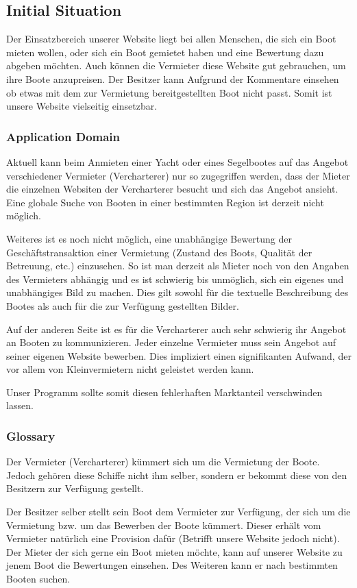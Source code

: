 \documentclass[12pt]{article}
\theoremstyle{definition}
\begin{document}
\subsection{Initial Situation}
	Der Einsatzbereich unserer Website liegt bei allen Menschen, die sich ein Boot mieten wollen, oder sich ein Boot gemietet haben und eine Bewertung dazu abgeben möchten.
	Auch können die Vermieter diese Website gut gebrauchen, um ihre Boote anzupreisen.
	Der Besitzer kann Aufgrund der Kommentare einsehen ob etwas mit dem zur Vermietung bereitgestellten Boot nicht passt. Somit ist unsere Website vielseitig einsetzbar.	

\subsubsection{Application Domain}
	Aktuell kann beim Anmieten einer Yacht oder eines Segelbootes auf das Angebot verschiedener Vermieter (Vercharterer) nur so zugegriffen werden, dass der Mieter die einzelnen Websiten der Vercharterer besucht und sich das Angebot ansieht. Eine globale Suche von Booten in einer bestimmten Region ist derzeit nicht möglich. 

	Weiteres ist es noch nicht möglich, eine unabhängige Bewertung der Geschäfts\-trans\-aktion einer Vermietung (Zustand des Boots, Qualität der Betreuung, etc.) einzusehen. So ist man derzeit als Mieter noch von den Angaben des Vermieters abhängig und es ist schwierig bis unmöglich, sich ein eigenes und unabhängiges Bild zu machen. Dies gilt sowohl für die textuelle Beschreibung des Bootes als auch für die zur Verfügung gestellten Bilder.
	
	Auf der anderen Seite ist es für die Vercharterer auch sehr schwierig ihr Angebot an Booten zu kommunizieren. Jeder einzelne Vermieter muss sein Angebot auf seiner eigenen Website bewerben. Dies impliziert einen signifikanten Aufwand, der vor allem von Kleinvermietern nicht geleistet werden kann. 
	
	Unser Programm sollte somit diesen fehlerhaften Marktanteil verschwinden lassen.

\subsubsection{Glossary}
	Der Vermieter (Vercharterer) kümmert sich um die Vermietung der Boote. Jedoch gehören diese Schiffe nicht ihm selber, sondern er bekommt diese von den Besitzern zur Verfügung gestellt.

	Der Besitzer selber stellt sein Boot dem Vermieter zur Verfügung, der sich um die Vermietung bzw. um das Bewerben der Boote kümmert. Dieser erhält vom Vermieter natürlich eine Provision dafür (Betrifft unsere Website jedoch nicht).
	Der Mieter der sich gerne ein Boot mieten möchte, kann auf unserer Website zu jenem Boot die Bewertungen einsehen. Des Weiteren kann er nach bestimmten Booten suchen.
\end{document}
